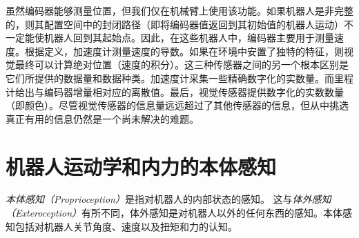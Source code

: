
虽然编码器能够测量位置，但我们仅在机械臂上使用该功能。如果机器人是非完整的，则其配置空间中的封闭路径（即将编码器值返回到其初始值的机器人运动）不一定能使机器人回到其起始点。因此，在这些机器人中，编码器主要用于测量速度。根据定义，加速度计测量速度的导数。如果在环境中安置了独特的特征，则视觉最终可以计算绝对位置（速度的积分）。这三种传感器之间的另一个根本区别是它们所提供的数据量和数据种类。加速度计采集一些精确数字化的实数量。而里程计给出与编码器增量相对应的离散值。最后，视觉传感器提供数字化的实数数量（即颜色）。尽管视觉传感器的信息量远远超过了其他传感器的信息，但从中挑选真正有用的信息仍然是一个尚未解决的难题。


\section{机器人运动学和内力的本体感知}
\emph{本体感知（Proprioception）}是指对机器人的内部状态的感知。
这与\emph{体外感知（Exteroception）}有所不同，体外感知是对机器人以外的任何东西的感知。本体感知包括对机器人关节角度、速度以及扭矩和力的认知。

